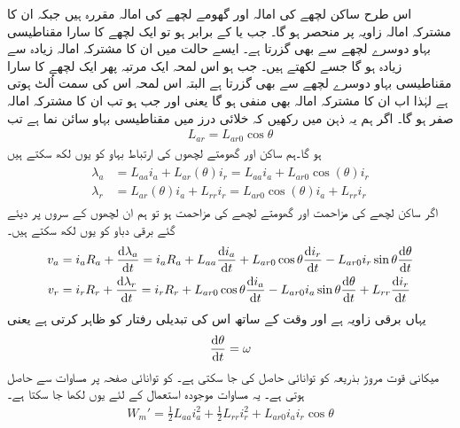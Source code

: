 اس طرح ساکن لچھے کی امالہ  اور گھومے لچھے کی امالہ  مقررہ ہیں جبکہ ان کا مشترکہ امالہ  زاویہ  پر منحصر ہو گا۔ جب  یا   کے برابر ہو تو ایک لچھے کا سارا مقناطیسی بہاو دوسرے لچھے سے بھی گزرتا ہے۔ ایسے حالت میں ان کا مشترکہ امالہ زیادہ سے زیادہ ہو گا جسے  لکھتے ہیں۔ جب   ہو اس لمحہ ایک مرتبہ پھر ایک لچھے کا سارا مقناطیسی بہاو دوسرے لچھے سے بھی گزرتا ہے البتہ اس لمحہ اس کی سمت اُلٹ ہوتی ہے لہٰذا اب ان کا مشترکہ امالہ بھی منفی ہو گا یعنی  اور جب  ہو  تب ان کا مشترکہ امالہ صفر ہو گا۔ اگر ہم یہ ذہن میں رکھیں کہ خلائی درز میں  مقناطیسی بہاو سائن نما ہے تب
\begin{align}
L_{ar}=L_{ar0} \cos \theta
\end{align}
ہو گا۔ہم ساکن اور گھومتے لچھوں کی ارتباط بہاو کو یوں لکھ سکتے ہیں
\begin{gather}
\begin{aligned}
\lambda_a&=L_{aa} i_a+L_{ar}(\theta) i_r=L_{aa} i_a+L_{ar0} \cos (\theta) i_r\\
\lambda_r&=L_{ar}(\theta) i_a+L_{rr} i_r=L_{ar0} \cos (\theta) i_a+L_{rr} i_r
\end{aligned}
\end{gather}
اگر ساکن لچھے کی مزاحمت  اور گھومتے لچھے کی مزاحمت  ہو تو ہم ان لچھوں کے سروں پر دیئے گئے برقی دباو کو یوں لکھ سکتے ہیں۔
\begin{gather}
\begin{aligned}
v_a&=i_a R_a +\frac{\dif \lambda_a}{\dif t}=i_a R_a+L_{aa} \frac{\dif i_a}{\dif t}+L_{ar0} \cos \theta \frac{\dif i_r}{\dif t}-L_{ar0}  i_r \sin \theta  \frac{\dif \theta}{\dif t}\\
v_r&=i_r R_r +\frac{\dif \lambda_r}{\dif t}=i_r R_r+L_{ar0} \cos \theta \frac{\dif i_a}{\dif t}-L_{ar0} i_a \sin \theta  \frac{\dif \theta}{\dif t}+L_{rr} \frac{\dif i_r}{\dif t}
\end{aligned}
\end{gather}
یہاں  برقی زاویہ ہے اور وقت کے ساتھ اس کی تبدیلی رفتار  کو ظاہر کرتی ہے یعنی
\begin{align}
\frac{\dif \theta}{\dif t}=\omega
\end{align}
میکانی قوت مروڑ بذریعہ کو توانائی حاصل کی جا سکتی ہے۔ کو توانائی صفحہ  پر مساوات   سے حاصل ہوتی ہے۔ یہ مساوات موجودہ استعمال کے لئے یوں لکھا جا سکتا ہے۔
\begin{align}
W_m'=\frac{1}{2} L_{aa} i_a^2+\frac{1}{2} L_{rr} i_r^2+L_{ar0} i_a i_r \cos \theta
\end{align}
